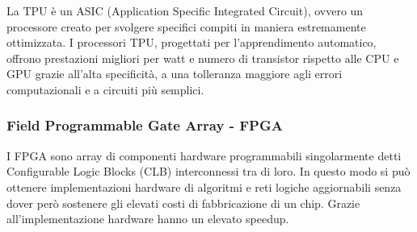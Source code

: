 \documentclass[a4paper]{article}
\begin{document}
La TPU è un ASIC (Application Specific Integrated Circuit), ovvero un processore creato per svolgere specifici compiti in maniera
estremamente ottimizzata. I processori TPU, progettati per l’apprendimento automatico, offrono prestazioni migliori per watt e
numero di transistor rispetto alle CPU e GPU grazie all'alta specificità, a una tolleranza maggiore agli errori computazionali
e a circuiti più semplici.

\subsubsection*{Field Programmable Gate Array - FPGA}
I FPGA sono array di componenti hardware programmabili singolarmente detti Configurable Logic Blocks (CLB) interconnessi tra di
loro. In questo modo si può ottenere implementazioni hardware di algoritmi e reti logiche aggiornabili senza dover però sostenere
gli elevati costi di fabbricazione di un chip. Grazie all'implementazione hardware hanno un elevato speedup.

\newpage
\end{document}
